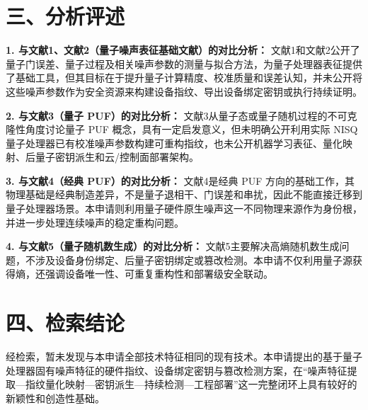 \documentclass[12pt,a4paper]{article}
\begin{document}
\section*{三、分析评述}

\textbf{1. 与文献1、文献2（量子噪声表征基础文献）的对比分析：}
文献1和文献2公开了量子门误差、量子过程及相关噪声参数的测量与拟合方法，为量子处理器表征提供了基础工具，但其目标在于提升量子计算精度、校准质量和误差认知，并未公开将这些噪声参数作为安全资源来构建设备指纹、导出设备绑定密钥或执行持续证明。

\textbf{2. 与文献3（量子 PUF）的对比分析：}
文献3从量子态或量子随机过程的不可克隆性角度讨论量子 PUF 概念，具有一定启发意义，但未明确公开利用实际 NISQ 量子处理器已有校准噪声参数构建可重构指纹，也未公开机器学习表征、量化映射、后量子密钥派生和云/控制面部署架构。

\textbf{3. 与文献4（经典 PUF）的对比分析：}
文献4是经典 PUF 方向的基础工作，其物理基础是经典制造差异，不是量子退相干、门误差和串扰，因此不能直接迁移到量子处理器场景。本申请则利用量子硬件原生噪声这一不同物理来源作为身份根，并进一步处理连续噪声的稳定重构问题。

\textbf{4. 与文献5（量子随机数生成）的对比分析：}
文献5主要解决高熵随机数生成问题，不涉及设备身份绑定、后量子密钥绑定或篡改检测。本申请不仅利用量子源获得熵，还强调设备唯一性、可重复重构性和部署级安全联动。

\section*{四、检索结论}

经检索，暂未发现与本申请全部技术特征相同的现有技术。本申请提出的基于量子处理器固有噪声特征的硬件指纹、设备绑定密钥与篡改检测方案，在“噪声特征提取—指纹量化映射—密钥派生—持续检测—工程部署”这一完整闭环上具有较好的新颖性和创造性基础。
\end{document}
